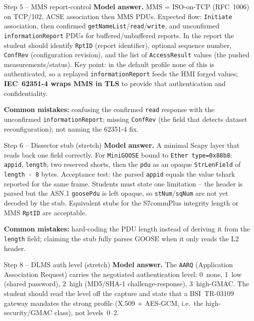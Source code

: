 \documentclass[11pt,a4paper]{article}
\begin{document}
\begin{solutionbox}{Step 5 -- MMS report-control}
\textbf{Model answer.} MMS = ISO-on-TCP (RFC~1006) on TCP/102, ACSE
association then MMS PDUs. Expected flow: \texttt{Initiate} association,
then confirmed \texttt{getNameList}/\texttt{read}/\texttt{write}, and
unconfirmed \texttt{informationReport} PDUs for buffered/unbuffered
reports. In the report the student should identify \texttt{RptID} (report
identifier), optional sequence number, \texttt{ConfRev} (configuration
revision), and the list of \texttt{AccessResult} values (the pushed
measurements/status). Key point: in the default profile none of this is
authenticated, so a replayed \texttt{informationReport} feeds the HMI
forged values; \textbf{IEC~62351-4 wraps MMS in TLS} to provide that
authentication and confidentiality.

\textbf{Common mistakes:} confusing the confirmed \texttt{read} response
with the unconfirmed \texttt{informationReport}; missing \texttt{ConfRev}
(the field that detects dataset reconfiguration); not naming the 62351-4
fix.
\end{solutionbox}

\begin{solutionbox}{Step 6 -- Dissector stub (stretch)}
\textbf{Model answer.} A minimal Scapy layer that reads back one field
correctly. For \texttt{MiniGOOSE} bound to \texttt{Ether type=0x88b8}:
\texttt{appid}, \texttt{length}, two reserved shorts, then the
\texttt{pdu} as an opaque \texttt{StrLenField} of \texttt{length - 8}
bytes. Acceptance test: the parsed \texttt{appid} equals the value tshark
reported for the same frame. Students must state one limitation -- the
header is parsed but the ASN.1 \texttt{goosePdu} is left opaque, so
\texttt{stNum}/\texttt{sqNum} are not yet decoded by the stub. Equivalent
stubs for the S7commPlus integrity length or MMS \texttt{RptID} are
acceptable.

\textbf{Common mistakes:} hard-coding the PDU length instead of deriving
it from the \texttt{length} field; claiming the stub fully parses GOOSE
when it only reads the L2 header.
\end{solutionbox}

\begin{solutionbox}{Step 8 -- DLMS auth level (stretch)}
\textbf{Model answer.} The \texttt{AARQ} (Application Association Request)
carries the negotiated authentication level: 0~none, 1~low (shared
password), 2~high (MD5/SHA-1 challenge-response), 3~high-GMAC. The student
should read the level off the capture and state that a BSI~TR-03109
gateway mandates the strong profile (X.509 + AES-GCM, i.e.\ the
high-security/GMAC class), not levels~0--2.
\end{solutionbox}
\end{document}
